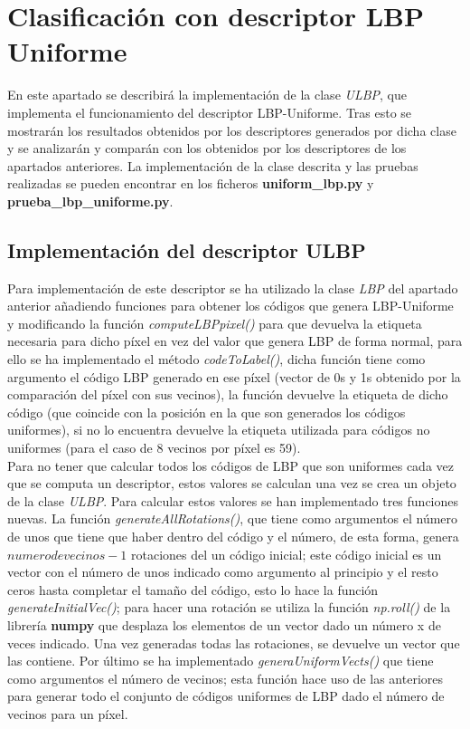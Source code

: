 \chapter{Clasificación con descriptor LBP Uniforme}
En este apartado se describirá la implementación de la clase \textit{ULBP}, que implementa el funcionamiento del descriptor LBP-Uniforme. Tras esto se mostrarán los resultados obtenidos por los descriptores generados por dicha clase y se analizarán y comparán con los obtenidos por los descriptores de los apartados anteriores. La implementación de la clase descrita y las pruebas realizadas se pueden encontrar en los ficheros \textbf{uniform\_lbp.py} y \textbf{prueba\_lbp\_uniforme.py}.

\section{Implementación del descriptor ULBP}
Para implementación de este descriptor se ha utilizado la clase \textit{LBP} del apartado anterior añadiendo funciones para obtener los códigos que genera LBP-Uniforme y modificando la función \textit{computeLBPpixel()} para que devuelva la etiqueta necesaria para dicho píxel en vez del valor que genera LBP de forma normal, para ello se ha implementado el método \textit{codeToLabel()}, dicha función tiene como argumento el código LBP generado en ese píxel (vector de 0s y 1s obtenido por la comparación del píxel con sus vecinos), la función devuelve la etiqueta de dicho código (que coincide con la posición en la que son generados los códigos uniformes), si no lo encuentra devuelve la etiqueta utilizada para códigos no uniformes (para el caso de 8 vecinos por píxel es 59).\\

Para no tener que calcular todos los códigos de LBP que son uniformes cada vez que se computa un descriptor, estos valores se calculan una vez se crea un objeto de la clase \textit{ULBP}. Para calcular estos valores se han implementado tres funciones nuevas. La función \textit{generateAllRotations()}, que tiene como argumentos el número de unos que tiene que haber dentro del código y el número, de esta forma, genera $numerodevecinos-1$ rotaciones del un código inicial; este código inicial es un vector con el número de unos indicado como argumento al principio y el resto ceros hasta completar el tamaño del código, esto lo hace la función \textit{generateInitialVec()}; para hacer una rotación se utiliza la función \textit{np.roll()} de la librería \textbf{numpy} que desplaza los elementos de un vector dado un número x de veces indicado. Una vez generadas todas las rotaciones, se devuelve un vector que las contiene. Por último se ha implementado \textit{generaUniformVects()} que tiene como argumentos el número de vecinos; esta función hace uso de las anteriores para generar todo el conjunto de códigos uniformes de LBP dado el número de vecinos para un píxel.

